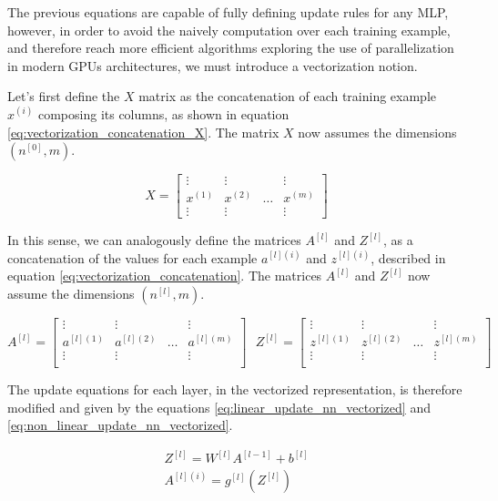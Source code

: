 The previous equations are capable of fully defining update rules for any MLP, however, in order to avoid the naively computation over each training example, and therefore reach more efficient algorithms exploring the use of parallelization in modern GPUs architectures, we must introduce a vectorization notion.

Let's first define the $X$ matrix as the concatenation of each training example $x^{(i)}$ composing its columns, as shown in equation \ref{eq:vectorization_concatenation_X}. The matrix $X$ now assumes the dimensions $(n^{[0]},m)$.

\begin{equation}
X = 
\begin{bmatrix}
\vdots & \vdots &  & \vdots \\
x^{(1)} & x^{(2)} & \dots & x^{(m)} \\
\vdots & \vdots &  & \vdots
\end{bmatrix}
\label{eq:vectorization_concatenation_X}
\end{equation}

In this sense, we can analogously define the matrices $A^{[l]}$ and $Z^{[l]}$, as a concatenation of the values for each example $a^{[l](i)}$ and $z^{[l](i)}$, described in equation \ref{eq:vectorization_concatenation}. The matrices $A^{[l]}$ and $Z^{[l]}$ now assume the dimensions $(n^{[l]},m)$.

\begin{equation}
A^{[l]} = 
\begin{bmatrix}
\vdots & \vdots &  & \vdots \\
a^{[l](1)} & a^{[l](2)} & \dots & a^{[l](m)} \\
\vdots & \vdots &  & \vdots \\
\end{bmatrix}
\text{ }
Z^{[l]} = 
\begin{bmatrix}
\vdots & \vdots &  & \vdots \\
z^{[l](1)} & z^{[l](2)} & \dots & z^{[l](m)} \\
\vdots & \vdots &  & \vdots \\
\end{bmatrix}
\label{eq:vectorization_concatenation}
\end{equation}

The update equations for each layer, in the vectorized representation, is therefore modified and given by the equations \ref{eq:linear_update_nn_vectorized} and \ref{eq:non_linear_update_nn_vectorized}.

\begin{align}
Z^{[l]} = W^{[l]}A^{[l-1]} + b^{[l]}
\label{eq:linear_update_nn_vectorized}
\\
A^{[l](i)} = g^{[l]}(Z^{[l]})
\label{eq:non_linear_update_nn_vectorized}
\end{align}

